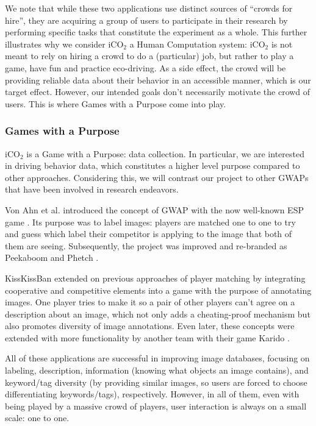 \documentclass[preprint,authoryear,12pt]{elsarticle}
\makeatletter
\renewcommand{\paragraph}{\@startsection{paragraph}{4}{\z@}%
  {-3.25ex\@plus -1ex \@minus -.2ex}%
  {1.5ex \@plus .2ex}%
  {\normalfont\normalsize\mdseries}}
\makeatother
\begin{document}
We note that while these two applications use distinct sources of ``crowds for hire'', they are acquiring a group of users to participate in their research by performing specific tasks that constitute the experiment as a whole. This further illustrates why we consider iCO$_2$ a Human Computation system: iCO$_2$ is not meant to rely on hiring a crowd to do a (particular) job, but rather to play a game, have fun and practice eco-driving. As a side effect, the crowd will be providing reliable data about their behavior in an accessible manner, which is our target effect. However, our intended goals don't necessarily motivate the crowd of users. This is where Games with a Purpose come into play.

\subsubsection{Games with a Purpose}

iCO$_2$ is a Game with a Purpose: data collection. In particular, we are interested in driving behavior data, which constitutes a higher level purpose compared to other approaches. Considering this, we will contrast our project to other GWAPs that have been involved in research endeavors.


Von Ahn et al. introduced the concept of GWAP with the now well-known ESP game \citep{vonAhn:2004}. Its purpose was to label images: players are matched one to one to try and guess which label their competitor is applying to the image that both of them are seeing. Subsequently, the project was improved and re-branded as Peekaboom \citep{vonAhn:2006} and Phetch \citep{vonAhn:2007}.

KissKissBan \citep{Ho:2009} extended on previous approaches of player matching by integrating cooperative and competitive elements into a game with the purpose of annotating images. One player tries to make it so a pair of other players can't agree on a description about an image, which not only adds a cheating-proof mechanism but also promotes diversity of image annotations. Even later, these concepts were extended with more functionality by another team with their game Karido \citep{steinmayr2011karido}.

All of these applications are successful in improving image databases, focusing on labeling, description, information (knowing what objects an image contains), and keyword/tag diversity (by providing similar images, so users are forced to choose differentiating keywords/tags), respectively. However, in all of them, even with being played by a massive crowd of players, user interaction is always on a small scale: one to one.
\end{document}
